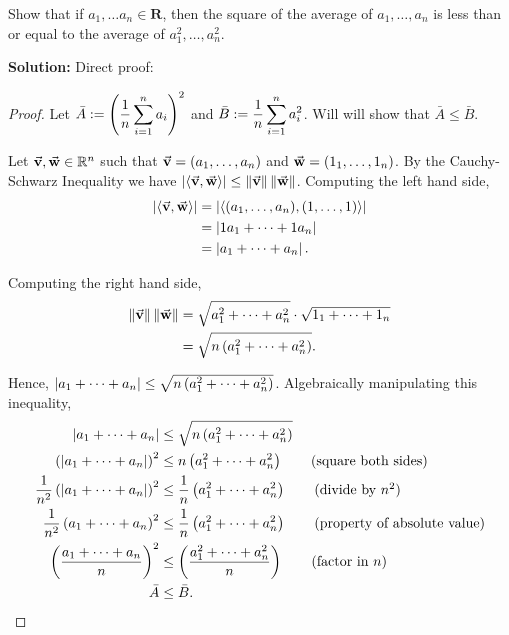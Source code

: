 Show that if $a_1, \ldots a_n \in \mathbf{R}$, then the square of the average of $a_1, \ldots , a_n$ is less than or equal to the average of $a_1^2, \ldots , a_n^2$.
\begin{mybox}\textbf{Solution:} Direct proof:
\begin{proof}
    Let $\bar{A} := \displaystyle \pars{ \over{n} \sum_{i=1}^n {a_i}}^2$ and $\bar{B} := \displaystyle \over{n} \sum_{i=1}^n {a_i^2}$. Will will show that $\bar{A} \leq \bar{B}$.
    
    \nnl Let $\bv, \bw \in \R^n$ such that $\bv = (\thru{a})$ and $\bw = (\thru{1})$. By the Cauchy-Schwarz Inequality we have $\abs{\inner{\bv,\bw}} \leq \norm{\bv} \norm{\bw}$. Computing the left hand side,
    \begin{align*}
        \abs{\inner{\bv,\bw}} &= \abs{\inner{ (\thru{a}), (1,\dots,1)}}\\
        &= \abs{ \sumthru{1a} }\\
        &= \abs{ \sumthru{a} }.
    \end{align*}
    
    \nnl Computing the right hand side,
    \begin{align*}
        \norm{\bv} \norm{\bw} &= \sqrt{a_1^2 + \cdots + a_n^2} \cdot \sqrt{1_1+\cdots+1_n}\\
        &= \sqrt{n \pars{a_1^2 + \cdots + a_n^2}}.
    \end{align*}
    
    \nnl Hence, $\abs{ \sumthru{a} } \leq \sqrt{n \pars{a_1^2 + \cdots + a_n^2}}$. Algebraically manipulating this inequality,
    \begin{align*}
        \abs{ \sumthru{a} } &\leq \sqrt{n \pars{a_1^2 + \cdots + a_n^2}}\\
        \pars{\abs{\sumthru{a}}}^2 &\leq n \pars{a_1^2 + \cdots + a_n^2} \tag{square both sides}\\
        \over{n^2}\pars{\abs{\sumthru{a}}}^2 &\leq \over{n}\pars{a_1^2 + \cdots + a_n^2}\tag{divide by $n^2$} \\
        \over{n^2}\pars{\sumthru{a}}^2 &\leq \over{n}\pars{a_1^2 + \cdots + a_n^2}\tag{property of absolute value} \\
        \pars{\frac{\sumthru{a}}{n}}^2 &\leq \pars{\frac{a_1^2 + \cdots + a_n^2}{n}}\tag{factor in $n$} \\
        \bar{A} &\leq \bar{B}.
    \end{align*} 
\end{proof}
\end{mybox}